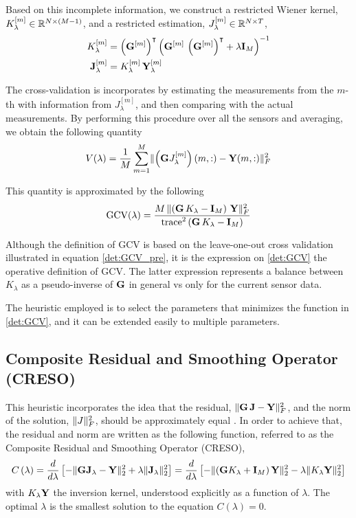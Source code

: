 Based on this incomplete information, we construct a restricted Wiener kernel, $K_\lambda^{[m]} \in \mathbb{R}^{N\times(M-1)}$, and a restricted estimation, $J_\lambda^{[m]} \in \mathbb{R}^{N\times T}$,
\begin{align}
K_\lambda^{[m]}
&=
\left( \mathbf{G}^{[m]} \right)^\intercal\left(  \mathbf{G}^{[m]}\, \left( \mathbf{G}^{[m]} \right)^\intercal + \lambda\mathbf{I}_M  \right)^{-1}
\\
\mathbf{J}_\lambda^{[m]}
&=
K_\lambda^{[m]}\, \mathbf{Y}_\lambda^{[m]}
\end{align}

The cross-validation is incorporates by estimating the measurements from the $m$-th with information from $J_\lambda^{[m]}$, and then comparing with the actual measurements.
%
By performing this procedure over all the sensors and averaging, we obtain the following quantity
\begin{equation}
V(\lambda) = 
\frac{1}{M}
\sum_{m=1}^M
\lVert  \left(  \mathbf{G} J_\lambda^{[m]}  \right)(m, :) - \mathbf{Y}(m,:)  \rVert_F^2
\label{det:GCV_pre}
\end{equation}

This quantity is approximated by the following
\begin{equation}
\text{GCV}(\lambda) = 
\frac{M\, \lVert \left( \mathbf{G}\, K_\lambda -\mathbf{I}_M  \right)\, \mathbf{Y} \rVert_F^2}{\text{trace}^2\left( \mathbf{G}\, K_\lambda - \mathbf{I}_M \right)}
\label{det:GCV}
\end{equation}

Although the definition of GCV is based on the leave-one-out cross validation illustrated in equation \eqref{det:GCV_pre}, it is the expression on \eqref{det:GCV} the operative definition of GCV.
%
The latter expression represents a balance between $K_\lambda$ as a pseudo-inverse of $\mathbf{G}$ in general vs only for the current sensor data.

The heuristic employed is to select the parameters that minimizes the function in \eqref{det:GCV}, and it can be extended easily to multiple parameters.

\subsection{Composite Residual and Smoothing Operator (CRESO)}

This heuristic incorporates the idea that the residual, $\lVert \mathbf{G}\, \mathbf{J} - \mathbf{Y} \rVert_F^2$, and the norm of the solution, $\lVert J \rVert_F^2$, should be approximately equal \cite{creso}.
%
In order to achieve that, the residual and norm are written as the following function, referred to as the Composite Residual and Smoothing Operator (CRESO),
\begin{equation}
C\left( \lambda \right) = 
\frac{d}{d\lambda} \left[  -\lVert \mathbf{G}\mathbf{J}_\lambda - \mathbf{Y} \rVert_2^2 + \lambda \lVert \mathbf{J}_\lambda \rVert_2^2 \right]
=
\frac{d}{d\lambda} \left[  - \lVert \left( \mathbf{G} K_\lambda + \mathbf{I}_M \right)\mathbf{Y} \rVert_2^2 - \lambda \lVert K_\lambda \mathbf{Y} \rVert_2^2 \right]
\end{equation}
with $K_\lambda \mathbf{Y}$ the inversion kernel, understood explicitly as a function of $\lambda$. 
%
The optimal $\lambda$ is the smallest solution to the equation $C(\lambda)=0$.

